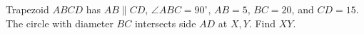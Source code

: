 Trapezoid $ABCD$ has $AB\parallel CD$, $\angle ABC=90^\circ$, $AB=5$, $BC=20$, and $CD=15$. The circle with diameter $BC$ intersects side $AD$ at $X,Y$. Find $XY$.
